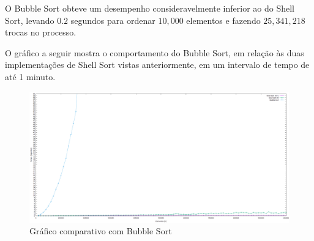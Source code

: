 \documentclass[12pt,twocolumn,a4paper]{article}
\begin{document}
    O Bubble Sort obteve um desempenho consideravelmente inferior ao do Shell
    Sort, levando $0.2$ segundos para ordenar $10,000$ elementos e fazendo
    $25,341,218$ trocas no processo.

    O gráfico a seguir mostra o comportamento do Bubble Sort, em relação às duas
    implementações de Shell Sort vistas anteriormente, em um intervalo de tempo
    de até 1 minuto.

    \begin{figure}
      \caption{Gráfico comparativo com Bubble Sort}
      \includegraphics{data/plots/plot_S1S2B_O2.png}
    \end{figure}
\end{document}
